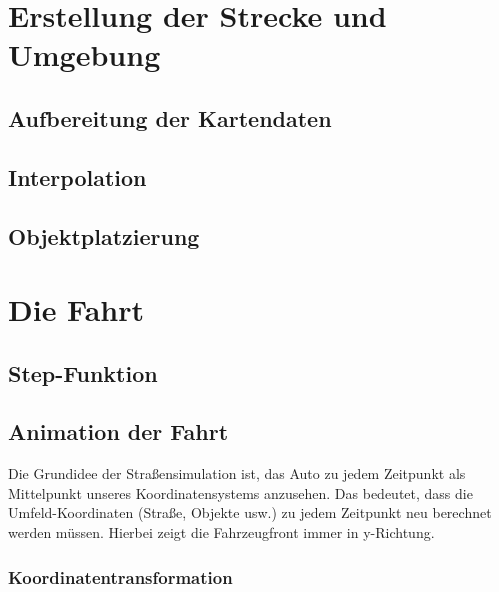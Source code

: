 \chapter{Erstellung der Strecke und Umgebung}

\section{Aufbereitung der Kartendaten}
\section{Interpolation}
\section{Objektplatzierung}

\chapter{Die Fahrt}



\section{Step-Funktion}
\section{Animation der Fahrt}

Die Grundidee der Straßensimulation ist, das Auto zu jedem Zeitpunkt als Mittelpunkt unseres Koordinatensystems anzusehen. Das bedeutet, dass die Umfeld-Koordinaten (Straße, Objekte usw.)  zu jedem Zeitpunkt neu berechnet werden müssen. Hierbei zeigt die Fahrzeugfront immer in y-Richtung.

\subsection{Koordinatentransformation}




